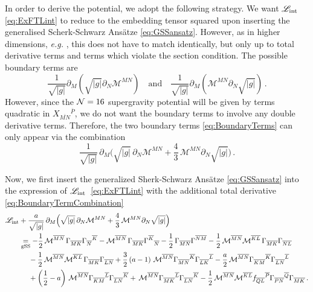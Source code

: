 \documentclass[a4paper, 11pt]{article}
\numberwithin{equation}{section}
\newcommand{\ov}[1]{\overline{#1}}
\newcommand{\+}{\oplus}
\newcommand{\gM}{\mathcal{M}}
\newcommand{\fl}[1]{\ov{#1}}
\newcommand{\dg}{\vert g \vert}
\newcommand{\M}{\ensuremath{\mathcal{M}}\xspace}
\begin{document}
In order to derive the potential, we adopt the following strategy. We want $\mathscr{L}_{\rm int}$ \eqref{eq:ExFTLint} to reduce to the embedding tensor squared upon inserting the generalised Scherk-Schwarz Ans\"{a}tze \eqref{eq:GSSansatz}. However, as in higher dimensions, \textit{e.g.} \cite{Berman:2012uy,Musaev:2013rq,Blair:2014zba}, this does not have to match identically, but only up to total derivative terms and terms which violate the section condition. The possible boundary terms are
\begin{equation} \label{eq:BoundaryTerms}
	\frac{1}{\sqrt{\dg}} \partial_M \left(\sqrt{\dg} \partial_N \gM^{MN} \right) \quad \text{and} \quad \frac{1}{\sqrt{\dg}} \partial_M \left( \gM^{MN} \partial_N \sqrt{\dg}\right) \,.
\end{equation}
However, since the ${\cal N}=16$ supergravity potential will be given by terms quadratic in $X_{\fl{MN}}{}^{\fl{P}}$, we do not want the boundary terms to involve any double derivative terms. Therefore, the two boundary terms \eqref{eq:BoundaryTerms} can only appear via the combination
\begin{equation} \label{eq:BoundaryTermCombination}
	\frac{1}{\sqrt{\dg}}\,\partial_{M}\Big(\sqrt{\dg}\,\partial_{N}\M^{MN}+\frac{4}{3}\,\M^{MN}\partial_{N}\sqrt{\dg}\Big) \,.
\end{equation}

Now, we first insert the generalized Sherk-Schwarz Ansätze \eqref{eq:GSSansatz} into the expression of $\mathscr{L}_{\rm int}$~\eqref{eq:ExFTLint} with the additional total derivative \eqref{eq:BoundaryTermCombination}
\begin{equation} \label{eq:Lintexpansion}
	\begin{aligned}
		\mathscr{L}_{\rm int} &+ \frac{a}{\sqrt{\vert g\vert}}\,\partial_{M}\Big(\sqrt{\vert g\vert}\,\partial_{N}\M^{MN}+\frac{4}{3}\,\M^{MN}\partial_{N}\sqrt{\vert g\vert}\Big)\\
		&\underset{\rm gSS}{=} -\frac{1}{2}\,\M^{\fl{MN}}\,\Gamma_{\fl{MK}}\Gamma_{\fl{N}}{}^{\fl{K}} -\M^{\fl{MN}}\,\Gamma_{\fl{MK}}\Gamma^{\fl{K}}{}_{\fl{N}} -\frac{1}{2}\,\Gamma_{\fl{MN}}\Gamma^{\fl{NM}} - \frac{1}{2}\,\M^{\fl{MN}}\M^{\fl{KL}}\,\Gamma_{\fl{MK}}\Gamma_{\fl{NL}} \\
		&\ \quad - \frac{1}{2}\,\M^{\fl{MN}}\M^{\fl{KL}}\,\Gamma_{\fl{MK}}\Gamma_{\fl{LN}} +\frac{3}{2}\left(a-1\right)\,\M^{\fl{MN}}\Gamma_{\fl{MN}}{}^{\fl{K}}\Gamma_{\fl{LK}}{}^{\fl{L}}-\frac{a}{2}\,\M^{\fl{MN}}\Gamma_{\fl{KM}}{}^{\fl{K}}\Gamma_{\fl{LN}}{}^{\fl{L}}\\
		&\ \quad + \left(\frac{1}{2}-a\right)\,\M^{\fl{MN}}\Gamma_{\fl{KM}}{}^{\fl{L}}\Gamma_{\fl{LN}}{}^{\fl{K}}+\,\M^{\fl{MN}}\Gamma_{\fl{MK}}{}^{\fl{L}}\Gamma_{\fl{LN}}{}^{\fl{K}}-\frac{1}{2}\,\M^{\fl{MN}}\M^{\fl{KL}}f_{\fl{QL}}{}^{\fl{P}}\Gamma_{\fl{PN}}{}^{\fl{Q}}\Gamma_{\fl{MK}}\,.
	\end{aligned}
\end{equation}
\end{document}
